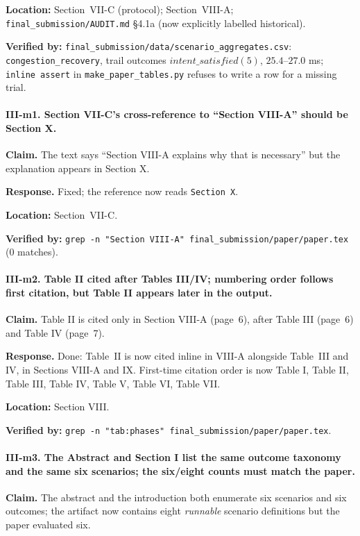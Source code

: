 \documentclass[11pt,a4paper]{article}
\begin{document}
\textbf{Location:} Section~VII-C (protocol); Section~VIII-A;
\texttt{final\_submission/AUDIT.md} §4.1a (now explicitly labelled
historical).

\textbf{Verified by:} \texttt{final\_submission/data/scenario\_aggregates.csv}:
\texttt{congestion\_recovery}, trail outcomes $intent\_satisfied (5)$,
$25.4$--$27.0$ ms;
\texttt{inline assert} in
\texttt{make\_paper\_tables.py} refuses to write a row for a missing trial.

\paragraph{III-m1. Section VII-C's cross-reference to ``Section VIII-A''
should be Section X.}

\textbf{Claim.} The text says ``Section VIII-A explains why that is
necessary'' but the explanation appears in Section X.

\textbf{Response.} Fixed; the reference now reads \texttt{Section~X}.

\textbf{Location:} Section~VII-C.

\textbf{Verified by:} \texttt{grep -n "Section VIII-A" final\_submission/paper/paper.tex}
(0 matches).

\paragraph{III-m2. Table II cited after Tables III/IV; numbering order follows
first citation, but Table II appears later in the output.}

\textbf{Claim.} Table II is cited only in Section VIII-A (page~6), after
Table III (page~6) and Table IV (page~7).

\textbf{Response.} Done: Table~II is now cited inline in VIII-A alongside
Table~III and IV, in Sections VIII-A and IX. First-time citation order is
now Table I, Table II, Table III, Table IV, Table V, Table VI, Table VII.

\textbf{Location:} Section VIII.

\textbf{Verified by:} \texttt{grep -n "tab:phases" final\_submission/paper/paper.tex}.

\paragraph{III-m3. The Abstract and Section I list the same outcome taxonomy
and the same six scenarios; the six/eight counts must match the paper.}

\textbf{Claim.} The abstract and the introduction both enumerate six
scenarios and six outcomes; the artifact now contains eight \emph{runnable}
scenario definitions but the paper evaluated six.
\end{document}
